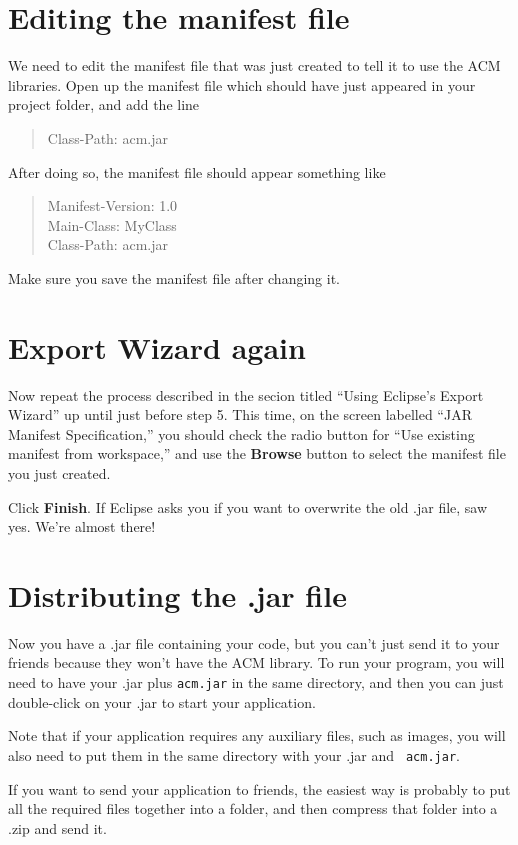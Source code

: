 \documentclass[11pt]{article}
\theoremstyle{plain}
\theoremstyle{definition}
\theoremstyle{remark}
\begin{document}
\section{Editing the manifest file}
We need to edit the manifest file that was just created to tell it to use the
ACM libraries. Open up the manifest file which should have just appeared in your
project folder, and add the line 
\begin{quote}
  Class-Path: acm.jar
\end{quote}
After doing so, the manifest file should appear something like
\begin{quote}
  Manifest-Version: 1.0 \\
  Main-Class: MyClass \\
  Class-Path: acm.jar
\end{quote}
Make sure you save the manifest file after changing it.
\section{Export Wizard again}
Now repeat the process described in the secion titled ``Using Eclipse's Export
Wizard'' up until just before step 5. This time, on the screen labelled ``JAR
Manifest Specification,'' you should check the radio button for ``Use existing
manifest from workspace,'' and use the {\bf Browse} button to select the
manifest file you just created.

Click {\bf Finish}. If Eclipse asks you if you want to overwrite the old .jar
file, saw yes. We're almost there!
\section{Distributing the .jar file}
Now you have a .jar file containing your code, but you can't just send it to
your friends because they won't have the ACM library. To run your program, you
will need to have your .jar plus {\tt acm.jar} in the same directory, and then
you can just double-click on your .jar to start your application.

Note that if your application requires any auxiliary files, such as images, you
will also need to put them in the same directory with your .jar and {\tt
acm.jar}.

If you want to send your application to friends, the easiest way is probably to
put all the required files together into a folder, and then compress that folder
into a .zip and send it.
\end{document}
